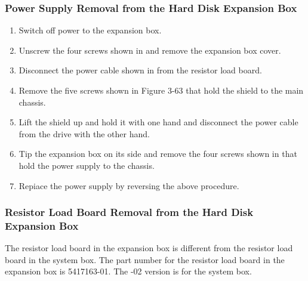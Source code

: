 \subsubsection{Power Supply Removal from the Hard Disk Expansion Box}
\begin{enumerate}
\item	Switch off power to the expansion box.

\item	Unscrew the four screws shown in  and remove the expansion box cover.
\newpage

\item	Disconnect the power cable shown in  from the resistor load board.
\newpage

\item	Remove the five screws shown in Figure 3-63 that hold the shield to
		the main chassis.

\newpage

\item	Lift the shield up and hold it with one hand and disconnect the power
		cable from the drive with the other hand.
\item	Tip the expansion box on its side and remove the four screws shown in
		 that hold the power supply to the chassis.


\newpage

\item	Repiace the power supply by reversing the above procedure.
\end{enumerate}

\subsubsection{Resistor Load Board Removal from the Hard Disk Expansion Box}

The resistor load board in the expansion box is different from the resistor
load board in the system box. The part number for the resistor load board
in the expansion box is 5417163-01. The -02 version is for the system box.

